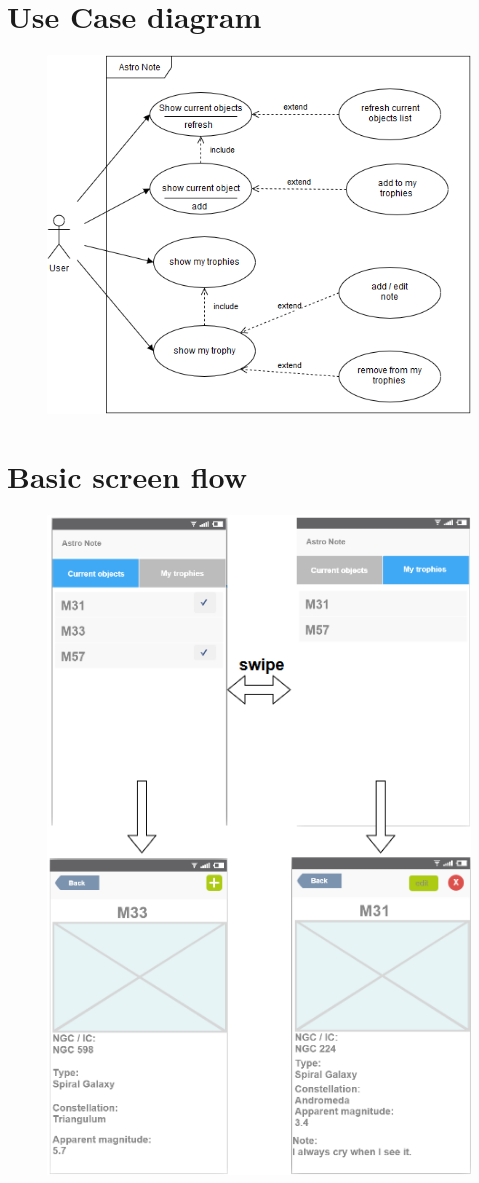 \documentclass[a4paper]{article}
\begin{document}
\section*{Use Case diagram}
\begin{figure}[H]
\includegraphics[width=\textwidth]{AstroNoteUseCase.png}
\end{figure}

\section*{Basic screen flow}
\begin{figure}[H]
\includegraphics[width=\textwidth]{AstroNoteScreens.png}
\end{figure}
\end{document}
